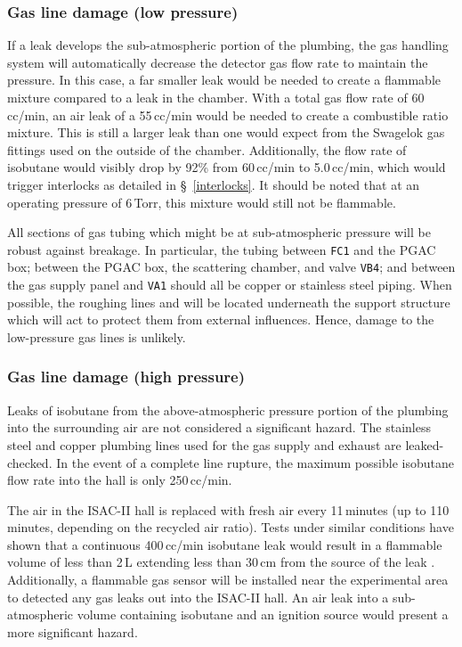 \subsubsection{Gas line damage (low pressure)}
If a leak develops the sub-atmospheric portion of the plumbing, the gas handling system will automatically decrease the detector gas flow rate to maintain the pressure. In this case, a far smaller leak would be needed to create a flammable mixture compared to a leak in the chamber.  With a total gas flow rate of 60\,cc/min,
an air leak of a 55\,cc/min
would be needed to create a combustible ratio mixture.  This is still a larger leak than one would expect from the Swagelok gas fittings used on the outside
of the chamber. Additionally, the flow rate of isobutane would visibly drop by 92\% from %
60\,cc/min to 5.0\,cc/min,
which would trigger interlocks as detailed in \S~\ref{interlocks}.  It should be noted that at an operating pressure of 6\,Torr, this mixture would still not be flammable.

All sections of gas tubing which might be at sub-atmospheric pressure will be robust against
breakage. In particular, the tubing between \texttt{FC1} and the PGAC box; between the PGAC box, the scattering chamber, and valve
\texttt{VB4}; and between the gas supply panel and \texttt{VA1} should all be copper or stainless steel piping.
When possible, the roughing lines and will be located underneath the support structure which will act to protect them from external influences. %
Hence, damage to the low-pressure gas lines is unlikely.

\subsubsection{Gas line damage (high pressure)}
Leaks of isobutane from the above-atmospheric pressure portion of the plumbing into the surrounding air are not considered a significant hazard.  The stainless steel and copper plumbing lines used for the gas supply and exhaust are leaked-checked.  In the event of a complete line rupture, the maximum possible isobutane flow rate into the hall is only 250\,cc/min.

The air in the ISAC-II hall is replaced with fresh air every 11\,minutes (up to 110 minutes, depending on the recycled air ratio).
Tests under similar conditions have shown that a continuous 400\,cc/min isobutane leak would result in a flammable volume of less than 2\,L extending less than 30\,cm from the source of the leak   \cite{Openshaw_2006}. Additionally, a flammable gas sensor will be installed near the experimental area to detected any gas
leaks out into the ISAC-II hall.  An air leak into a sub-atmospheric volume containing isobutane and an ignition source would present a more significant hazard.

